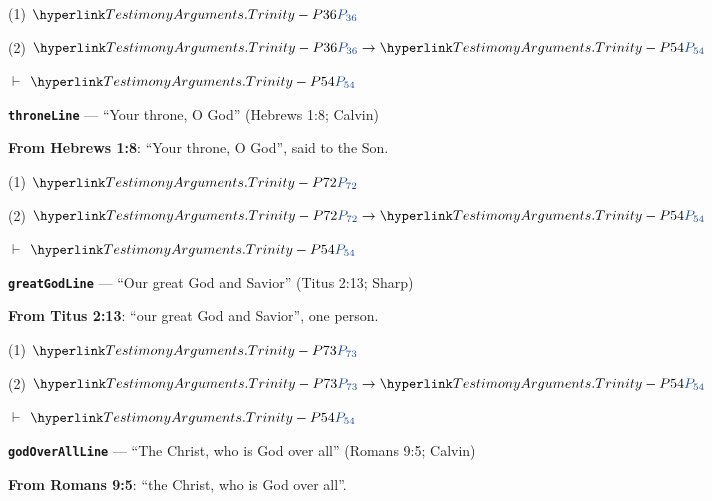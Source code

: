 \documentclass[11pt,paper=\testimonypaper,DIV=13,parskip=false]{scrartcl}
\begin{document}
\begin{derivation}
  \item[(1)] \(\pvar{TestimonyArguments.Trinity}{36}\)
  \item[(2)] \(\pvar{TestimonyArguments.Trinity}{36} \rightarrow \pvar{TestimonyArguments.Trinity}{54}\)
  \item[\(\vdash\)] \(\pvar{TestimonyArguments.Trinity}{54}\)
\end{derivation}
\par\medskip\noindent\textbf{\texttt{throne\allowbreak{}Line}} --- “Your throne, O God” (Hebrews 1:8; Calvin)\par\nobreak\noindent
\textbf{From Hebrews 1:8}: “Your throne, O God”, said to the Son.

\begin{derivation}
  \item[(1)] \(\pvar{TestimonyArguments.Trinity}{72}\)
  \item[(2)] \(\pvar{TestimonyArguments.Trinity}{72} \rightarrow \pvar{TestimonyArguments.Trinity}{54}\)
  \item[\(\vdash\)] \(\pvar{TestimonyArguments.Trinity}{54}\)
\end{derivation}
\par\medskip\noindent\textbf{\texttt{great\allowbreak{}God\allowbreak{}Line}} --- “Our great God and Savior” (Titus 2:13; Sharp)\par\nobreak\noindent
\textbf{From Titus 2:13}: “our great God and Savior”, one person.

\begin{derivation}
  \item[(1)] \(\pvar{TestimonyArguments.Trinity}{73}\)
  \item[(2)] \(\pvar{TestimonyArguments.Trinity}{73} \rightarrow \pvar{TestimonyArguments.Trinity}{54}\)
  \item[\(\vdash\)] \(\pvar{TestimonyArguments.Trinity}{54}\)
\end{derivation}
\par\medskip\noindent\textbf{\texttt{god\allowbreak{}Over\allowbreak{}All\allowbreak{}Line}} --- “The Christ, who is God over all” (Romans 9:5; Calvin)\par\nobreak\noindent
\textbf{From Romans 9:5}: “the Christ, who is God over all”.
\end{document}
